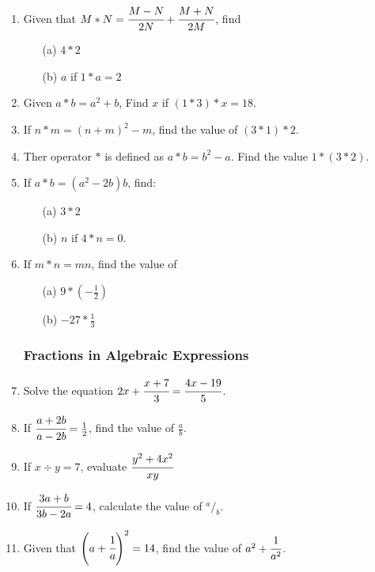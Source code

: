 \begin{enumerate}
	\item Given that $M * N = \cfrac{M - N}{2N} + \cfrac{M + N}{2M}$, find
		\begin{itemize}
		\item[(a)] $4 * 2$
		\item[(b)] $a$ if $ 1 * a = 2$
		\end{itemize}
		
	\item Given $a * b = a^2 + b$, Find $x$ if $(1 * 3) * x = 18$.
	
	\item If $n * m = (n + m)^2 - m$, find the value of $(3 * 1) * 2$.
	
	\item Ther operator $*$ is defined as $a * b = b^2 - a$. Find the value $1 * (3 * 2)$.
	
	\item If $a * b = (a^2 - 2b)b$, find:
		\begin{itemize}
		\item[(a)] $3 * 2$
		\item[(b)] $n$ if $ 4 * n = 0$.
		\end{itemize}
		
	\item If $m * n = mn$, find the value of
		\begin{itemize}
		\item[(a)] $9 * (-\frac{1}{2})$
		\item[(b)] $ -27 * \frac{1}{3}$
		\end{itemize}		
		
		\subsubsection{Fractions in Algebraic Expressions}
	\item Solve the equation $2x + \cfrac{x + 7}{3} = \cfrac{4x - 19}{5}$.
		
	\item If $\cfrac{a + 2b}{a - 2b} = \frac{1}{2}$, find the value of $\frac{a}{b}$.
	
	\item If $x \div y = 7$, evaluate $\cfrac{y^2 + 4x^2}{xy}$
	
	\item If $\cfrac{3a + b}{3b - 2a} = 4$, calculate the value of $^a/_b$.
	
	\item Given that $\left(a + \cfrac{1}{a}\right)^2 = 14$, find the value of $a^2 + \cfrac{1}{a^2}$.
	

\end{enumerate}

